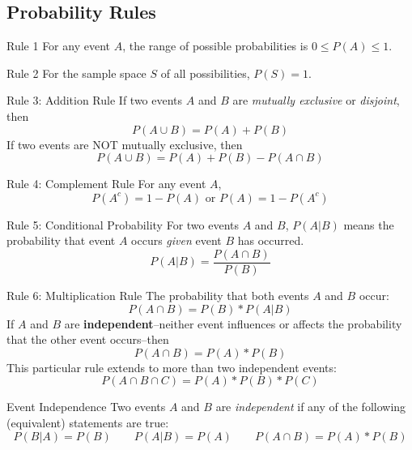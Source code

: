 \documentclass[]{article}
\newenvironment{definitions}{
	\begin{description}[font=\sffamily\bfseries, leftmargin=1cm, style=nextline]
	}{
	\end{description}
}
\begin{document}
	\subsection{Probability Rules}
	\begin{definitions}
		\item[Rule 1]
		For any event $A$, the range of possible probabilities is $0 \leq P(A) \leq 1$.
		\item[Rule 2]
		For the sample space $S$ of all possibilities, $P(S) = 1$.
		\item[Rule 3: Addition Rule]
		If two events $A$ and $B$ are \textit{mutually exclusive} or \textit{disjoint}, then
		\[P(A \cup B) = P(A) + P(B)\]
		If two events are NOT mutually exclusive, then
		\[P(A \cup B) = P(A) + P(B) - P(A \cap B)\]
		\item[Rule 4: Complement Rule]
		For any event $A$,
		\[P(A^c) = 1 - P(A) \text{ or } P(A) = 1 - P(A^c)\]
		\item[Rule 5: Conditional Probability]
		For two events $A$ and $B$, $P(A|B)$ means the probability that event $A$ occurs \textit{given} event $B$ has occurred.
		\[ P(A|B) = \frac{P(A \cap B)}{P(B)}\]
		\item[Rule 6: Multiplication Rule]
		The probability that both events $A$ and $B$ occur:
		\[P(A \cap B) = P(B) * P(A|B)\]
		If $A$ and $B$ are \textbf{independent}--neither event influences or affects the probability that the other event occurs--then
		\[ P(A \cap B) = P(A) * P(B)\]
		This particular rule extends to more than two independent events:
		\[ P(A \cap B \cap C) = P(A) * P(B) * P(C)\]
	\item[Event Independence]
	Two events $A$ and $B$ are \textit{independent} if any of the following (equivalent) statements are true:
	\[P(B|A) = P(B) \qquad P(A|B) = P(A) \qquad P(A\cap B) = P(A)*P(B)\]
\end{definitions}
\end{document}
